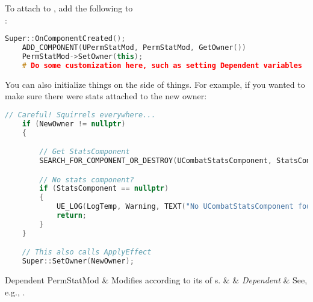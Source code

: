 To attach  to , add the following to\\:
\begin{lstlisting}[language=c++]
	Super::OnComponentCreated();
	ADD_COMPONENT(UPermStatMod, PermStatMod, GetOwner())
	PermStatMod->SetOwner(this);
	# Do some customization here, such as setting Dependent variables
\end{lstlisting}
You can also initialize things on the  side of things. For example, if you wanted to make sure there were stats attached to the new owner:
\begin{lstlisting}[language=c++]
	// Careful! Squirrels everywhere...
	if (NewOwner != nullptr)
	{

		// Get StatsComponent
		SEARCH_FOR_COMPONENT_OR_DESTROY(UCombatStatsComponent, StatsComponent, NewOwner->GetOwner(), true)

		// No stats component?
		if (StatsComponent == nullptr)
		{
			UE_LOG(LogTemp, Warning, TEXT("No UCombatStatsComponent found for PermStatMod! This is required *before* the Owner is set."))
			return;
		}
	}

	// This also calls ApplyEffect
	Super::SetOwner(NewOwner);
\end{lstlisting}

\begin{EffectTable}{Dependent}
	PermStatMod	& {Modifies according to its  of s.}	&  & \textit{Dependent} & See, e.g., .\\
\end{EffectTable}


\postamble{}